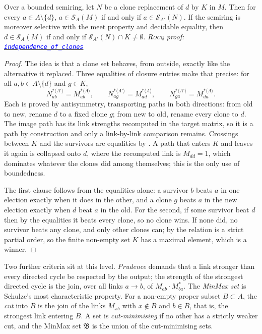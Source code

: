 \documentclass[a4paper,UKenglish,cleveref,autoref,thm-restate,anonymous]{lipics-v2021}
\newcommand{\Mstar}{M^{\ast}}
\newcommand{\clo}[2]{#1^{\ast\langle #2\rangle}}
\newcommand{\rocq}{\textsc{Rocq}}
\newcommand{\anonrepo}{https://anonymous.4open.science/r/Semiring_graph_algorithm-000E}
\newcommand{\rocqfile}[2]{\href{\anonrepo/#1}{\textcolor{blue}{\texttt{#2}}}}
\newcommand{\proofat}[2]{{\footnotesize\itshape\rocq{} proof: \rocqfile{#1}{#2}}}
\begin{document}
\begin{theorem}\label{thm:clones}
Over a bounded semiring, let $N$ be a clone replacement of $d$ by $K$ in
$M$. Then for every $a \in A \setminus \{d\}$,
$a \in \mathcal{S}_{A}(M)$ if and only if $a \in \mathcal{S}_{A'}(N)$. If
the semiring is moreover selective with the meet property and decidable
equality, then $d \in \mathcal{S}_{A}(M)$ if and only if
$\mathcal{S}_{A'}(N) \cap K \neq \emptyset$.
\proofat{algorithm/CloneN.v}{independence\_of\_clones}
\end{theorem}

\begin{proof}
The idea is that a clone set behaves, from outside, exactly like the
alternative it replaced. Three equalities of closure entries make that
precise: for all $a, b \in A \setminus \{d\}$ and $g \in K$,
\[
  \clo{N}{A'}_{ab} = \clo{M}{A}_{ab}, \qquad
  \clo{N}{A'}_{ag} = \clo{M}{A}_{ad}, \qquad
  \clo{N}{A'}_{ga} = \clo{M}{A}_{da}.
\]
Each is proved by antisymmetry, transporting paths in both directions:
from old to new, rename $d$ to a fixed clone $g$; from new to old, rename
every clone to $d$. The image path has its link strengths recomputed in
the target matrix, so it is a path by construction and only a link-by-link
comparison remains. Crossings between $K$ and the survivors are equalities
by . A path that enters $K$ and leaves it again is
collapsed onto $d$, where the recomputed link is $M_{dd} = 1$, which
dominates whatever the clones did among themselves; this is the only use
of boundedness.

The first clause follows from the equalities alone: a survivor $b$ beats
$a$ in one election exactly when it does in the other, and a clone $g$
beats $a$ in the new election exactly when $d$ beat $a$ in the old. For the
second, if some survivor beat $d$ then by the equalities it beats every
clone, so no clone wins. If none did, no survivor beats any clone, and only
other clones can; by  the relation is a strict partial
order, so the finite non-empty set $K$ has a maximal element, which is a
winner.
\end{proof}

Two further criteria sit at this level. \emph{Prudence} demands that a
link stronger than every directed cycle be respected by the output; the
strength of the strongest directed cycle is the join, over all links
$a \to b$, of $M_{ab} \cdot \Mstar_{ba}$. The \emph{MinMax set} is
Schulze's most characteristic property. For a non-empty proper subset
$B \subset A$, the \emph{cut} into $B$ is the join of the links $M_{xb}$
with $x \notin B$ and $b \in B$, that is, the strongest link entering $B$.
A set is \emph{cut-minimising} if no other has a strictly weaker cut, and
the MinMax set $\mathfrak{B}$ is the union of the cut-minimising sets.
\end{document}
